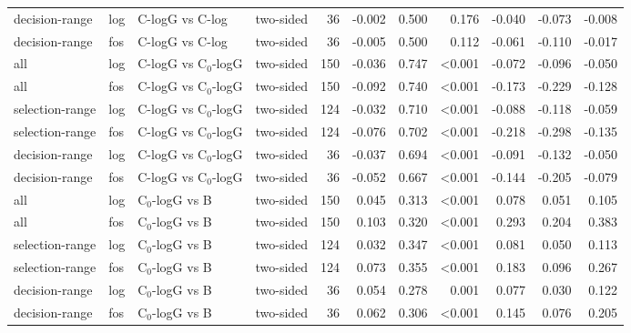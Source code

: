 \begin{longtable}{llllrrrrrrr}
decision-range & log & C-logG vs C-log & two-sided & 36 & -0.002 & 0.500 & 0.176 & -0.040 & -0.073 & -0.008 \\
decision-range & fos & C-logG vs C-log & two-sided & 36 & -0.005 & 0.500 & 0.112 & -0.061 & -0.110 & -0.017 \\
all & log & C-logG vs C$_0$-logG & two-sided & 150 & -0.036 & 0.747 & <0.001 & -0.072 & -0.096 & -0.050 \\
all & fos & C-logG vs C$_0$-logG & two-sided & 150 & -0.092 & 0.740 & <0.001 & -0.173 & -0.229 & -0.128 \\
selection-range & log & C-logG vs C$_0$-logG & two-sided & 124 & -0.032 & 0.710 & <0.001 & -0.088 & -0.118 & -0.059 \\
selection-range & fos & C-logG vs C$_0$-logG & two-sided & 124 & -0.076 & 0.702 & <0.001 & -0.218 & -0.298 & -0.135 \\
decision-range & log & C-logG vs C$_0$-logG & two-sided & 36 & -0.037 & 0.694 & <0.001 & -0.091 & -0.132 & -0.050 \\
decision-range & fos & C-logG vs C$_0$-logG & two-sided & 36 & -0.052 & 0.667 & <0.001 & -0.144 & -0.205 & -0.079 \\
all & log & C$_0$-logG vs B & two-sided & 150 & 0.045 & 0.313 & <0.001 & 0.078 & 0.051 & 0.105 \\
all & fos & C$_0$-logG vs B & two-sided & 150 & 0.103 & 0.320 & <0.001 & 0.293 & 0.204 & 0.383 \\
selection-range & log & C$_0$-logG vs B & two-sided & 124 & 0.032 & 0.347 & <0.001 & 0.081 & 0.050 & 0.113 \\
selection-range & fos & C$_0$-logG vs B & two-sided & 124 & 0.073 & 0.355 & <0.001 & 0.183 & 0.096 & 0.267 \\
decision-range & log & C$_0$-logG vs B & two-sided & 36 & 0.054 & 0.278 & 0.001 & 0.077 & 0.030 & 0.122 \\
decision-range & fos & C$_0$-logG vs B & two-sided & 36 & 0.062 & 0.306 & <0.001 & 0.145 & 0.076 & 0.205 \\
\end{longtable}
\endgroup
